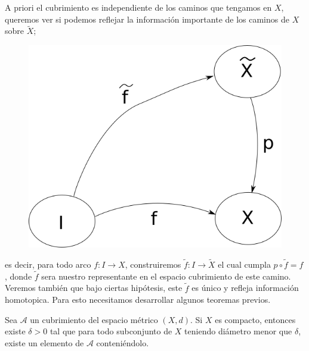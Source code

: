 A priori el cubrimiento es independiente de los caminos que tengamos
en \(X\), queremos ver si podemos reflejar la información importante de
los caminos de \(X\) sobre \(\tilde{X}\);
\begin{figure}[h]
  \centering
  \includegraphics[scale=0.3]{./imagenes/lifting-path.png}
\end{figure}
es decir, para todo arco \(f : I \to X\), construiremos \(\tilde f : I
\to \tilde X\) el cual cumpla \(p \circ \tilde f = f \), donde \(\tilde
f\) sera nuestro representante en el espacio cubrimiento de este
camino. Veremos también que bajo ciertas hipótesis, este \(\tilde f\)
es único y refleja información homotopica. Para esto necesitamos
desarrollar algunos teoremas previos.
\begin{lema} \label{thm:lebesgue-number-lema}
  Sea \(\mathcal A\) un cubrimiento del espacio métrico \((X,d)\). Si
  \(X\) es compacto, entonces existe \(\delta > 0\) tal que para todo
  subconjunto de \(X\) teniendo diámetro menor que \(\delta\), existe un
  elemento de \(\mathcal A\) conteniéndolo.
\end{lema}
